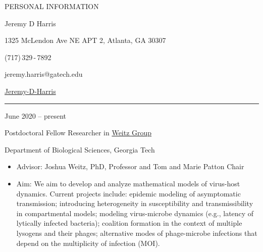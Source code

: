 \documentclass[a4paper,10pt]{article}
\newlength{\cvcolumngapwidth}
\newlength{\cvleftcolumnwidth}
\newlength{\cvrightcolumnwidth}
\newcommand{\cvnamestyle}[1]{{\Large\cvnamefont\textcolor{cvnamecolor}{#1}}}
\newcommand{\cvsectionstyle}[1]{{\normalsize\cvsectionfont\textcolor{cvsectioncolor}{#1}}}
\newcommand{\cvtitlestyle}[1]{{\large\cvtitlefont\textcolor{cvtitlecolor}{#1}}}
\newcommand{\cvdurationstyle}[1]{{\small\cvdurationfont\textcolor{cvdurationcolor}{#1}}}
\newlength{\cvafteritemskipamount}
\newlength{\cvaftersectionskipamount}
\newlength{\cvafternameskipamount}
\newlength{\cvafterpersonalinfolineskipamount}
\newlength{\cvaftertitleskipamount}
\newlength{\cvparskip}
\newcommand{\cvpersonalinfo}[2]{
            \begin{minipage}[t]{\cvleftcolumnwidth}
                \vspace{0mm} %
                \raggedleft #1
            \end{minipage}%
            \hspace{\cvcolumngapwidth}%
            \begin{minipage}[t]{\cvrightcolumnwidth}
                \vspace{0mm} %
                #2
            \end{minipage}
        
            \vspace{\cvafteritemskipamount}
        }
\newcommand{\cvname}[1]{
            \cvnamestyle{#1}
        
            \vspace{\cvafternameskipamount}
        }
\newcommand{\cvpersonalinfolinewithicon}[3]{
            \raisebox{.5\fontcharht\font`E-.5\height}{\texttt{[image: \#2]}}
            #3
        
            \vspace{\cvafterpersonalinfolineskipamount}
        }
\newcommand{\cvsection}[1]{
            \begin{minipage}[t]{\cvleftcolumnwidth}
                \raggedleft\cvsectionstyle{#1}
            \end{minipage}%
            \hspace{\cvcolumngapwidth}%
            \begin{minipage}[t]{\cvrightcolumnwidth}
                \textcolor{cvrulecolor}{\rule{\cvrightcolumnwidth}{0.3mm}}
            \end{minipage}
        
            \vspace{\cvaftersectionskipamount}
        }
\newcommand{\cvitem}[2]{
            \begin{minipage}[t]{\cvleftcolumnwidth}
                \raggedleft #1
            \end{minipage}%
            \hspace{\cvcolumngapwidth}%
            \begin{minipage}[t]{\cvrightcolumnwidth}
                \setlength{\parskip}{\cvparskip} #2
            \end{minipage}
        
            \vspace{\cvafteritemskipamount}
        }
\newcommand{\cvtitle}[1]{
            \cvtitlestyle{#1}
        
            \vspace{\cvaftertitleskipamount}
            \vspace{-\cvparskip}
        }
\begin{document}
        
        
        
        \cvpersonalinfo{
            \cvsectionstyle{PERSONAL INFORMATION}
        }{
            \cvname{Jeremy D Harris}
        
            \cvpersonalinfolinewithicon{height=4mm}{resources/europasscv-icons/address_europass_icon.pdf}{
        1325 McLendon Ave NE APT 2, Atlanta, GA 30307
            }
        
            \cvpersonalinfolinewithicon{height=4mm}{resources/europasscv-icons/mobile_europass_icon.pdf}{
                (717)\,329\,-\,7892
            }
        
            \cvpersonalinfolinewithicon{height=4mm}{resources/europasscv-icons/mail_europass_icon.pdf}{
                jeremy.harris@gatech.edu
            }
        
        \cvpersonalinfolinewithicon{height=4mm}{resources/europasscv-icons/github_icon.png}{
	\href{https://github.com/Jeremy-D-Harris/}{Jeremy-D-Harris}
        }
        
        }
        
        
        
        \cvsection{WORK EXPERIENCE}
        
        \cvitem{
            \cvdurationstyle{June 2020 -- present}
        }{
            \cvtitle{Postdoctoral Fellow Researcher in \href{https://weitzgroup.biosci.gatech.edu/}{Weitz Group}}
        
        	Department of Biological Sciences, Georgia Tech%
        
            \begin{itemize}[leftmargin=*]
            	\item Advisor: Joshua Weitz, PhD, Professor and Tom and Marie Patton Chair
                \item Aim: We aim to develop and analyze mathematical models of virus-host dynamics. Current projects include: epidemic modeling of asymptomatic transmission; introducing heterogeneity in susceptibility and transmissibility in compartmental models; modeling virus-microbe dynamics (e.g., latency of lytically infected bacteria); coalition formation in the context of multiple lysogens and their phages; alternative modes of phage-microbe infections that depend on the multiplicity of infection (MOI). 
        
            \end{itemize}
        }
        
\end{document}
